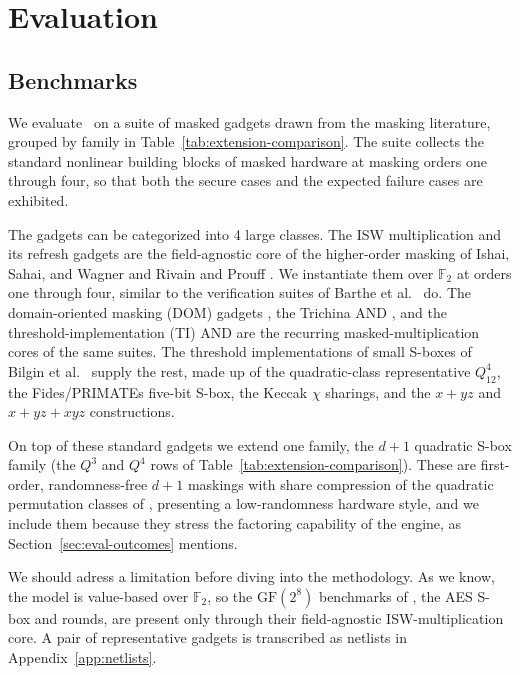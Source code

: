 \setlength{\parindent}{0pt}
\chapter{Evaluation}
\label{chap:evaluation}
\section{Benchmarks}
\label{sec:eval-benchmarks}

We evaluate \toolname\ on a suite of masked gadgets drawn from the masking
literature, grouped by family in Table~\ref{tab:extension-comparison}. The suite 
collects the standard nonlinear building blocks of masked hardware at masking orders
one through four, so that both the secure cases and the expected failure cases are exhibited.

The gadgets can be categorized into 4 large classes. The ISW multiplication and its refresh gadgets are
the field-agnostic core of the higher-order masking of Ishai, Sahai, and Wagner
\parencite{10.1007/978-3-540-45146-4_27} and Rivain and Prouff
\parencite{rivain2010provably}. We instantiate them over $\mathbb{F}_2$ at orders
one through four, similar to the verification suites of Barthe et al.\
\parencite{barthe2015verified, 10.1007/978-3-030-29959-0_15} do. The
domain-oriented masking (DOM) gadgets \parencite{gross2016domain}, the Trichina AND
\parencite{trichina2003combinational}, and the threshold-implementation (TI) AND
\parencite{nikova2006threshold} are the recurring masked-multiplication cores of the
same suites. The threshold implementations of small S-boxes of Bilgin et al.\
\parencite{bilgin2015threshold} supply the rest, made up of the quadratic-class representative
$Q^4_{12}$, the Fides/PRIMATEs five-bit S-box, the Keccak $\chi$ sharings, and the
$x+yz$ and $x+yz+xyz$ constructions.

On top of these standard gadgets we extend one family, the $d{+}1$
quadratic S-box family (the $Q^3$ and $Q^4$ rows of
Table~\ref{tab:extension-comparison}). These are first-order, randomness-free
$d{+}1$ maskings with share compression of the quadratic permutation classes of
\parencite{bilgin2015threshold}, presenting a low-randomness hardware style, and we
include them because they stress the factoring capability of the engine, as
Section~\ref{sec:eval-outcomes} mentions.

We should adress a limitation before diving into the methodology. As we know, the model
is value-based over $\mathbb{F}_2$, so the $\mathrm{GF}(2^8)$ benchmarks of
\parencite{barthe2015verified}, the AES S-box and rounds, are present only through their
field-agnostic ISW-multiplication core. %
A pair of representative gadgets is transcribed as netlists in Appendix~\ref{app:netlists}.

